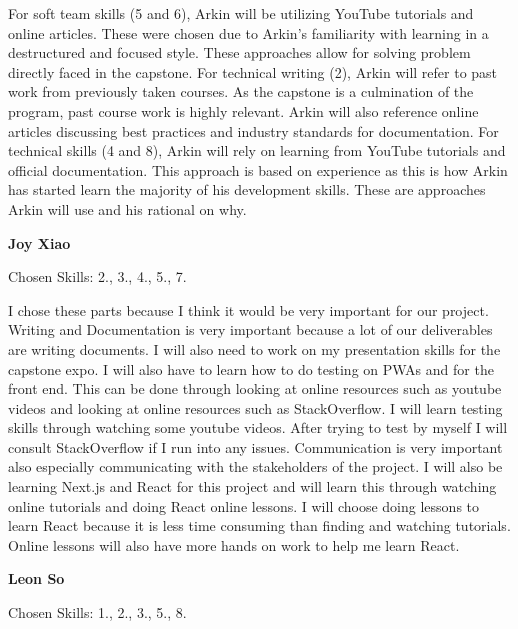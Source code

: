 \documentclass[12pt]{article}
\begin{document}
\begin{enumerate}
	      For soft team skills (5 and 6), Arkin will be utilizing YouTube tutorials and online articles.
	      These were chosen due to Arkin's familiarity with learning in a destructured and focused style.
	      These approaches allow for solving problem directly faced in the capstone. For technical writing
	      (2), Arkin will refer to past work from previously taken courses. As the capstone is a culmination
	      of the program, past course work is highly relevant. Arkin will also reference online articles
	      discussing best practices and industry standards for documentation. For technical skills (4 and 8),
	      Arkin will rely on learning from YouTube tutorials and official documentation. This approach is
	      based on experience as this is how Arkin has started learn the majority of his development skills.
	      These are approaches Arkin will use and his rational on why.

	      \textbf{Joy Xiao}

	      Chosen Skills: 2., 3., 4., 5., 7.

	      I chose these parts because I think it would be very important for our project. Writing and
	      Documentation is very important because a lot of our deliverables are writing documents. I will
	      also need to work on my presentation skills for the capstone expo. I will also have to learn how to
	      do testing on PWAs and for the front end. This can be done through looking at online resources such
	      as youtube videos and looking at online resources such as StackOverflow. I will learn testing
	      skills through watching some youtube videos. After trying to test by myself I will consult
	      StackOverflow if I run into any issues. Communication is very important also especially
	      communicating with the stakeholders of the project. I will also be learning Next.js and React for
	      this project and will learn this through watching online tutorials and doing React online lessons.
	      I will choose doing lessons to learn React because it is less time consuming than finding and
	      watching tutorials. Online lessons will also have more hands on work to help me learn React.

	      \textbf{Leon So}

	      Chosen Skills: 1., 2., 3., 5., 8.


\end{enumerate}
\end{document}
